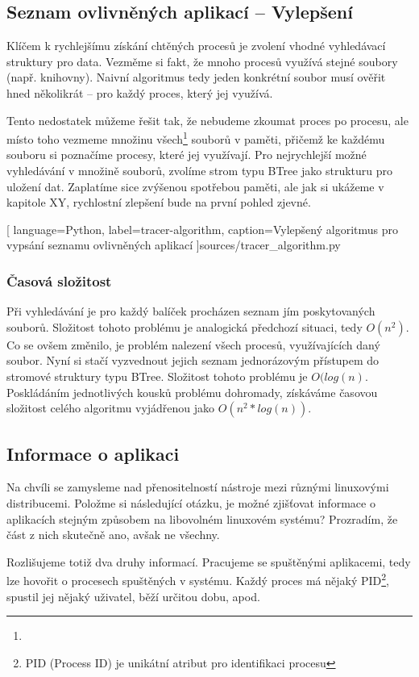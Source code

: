 \documentclass[
  field=inf,
  biblatex,
  glossaries,
  index
]{kidiplom}
\begin{document}
	\subsection{Seznam ovlivněných aplikací -- Vylepšení}
	Klíčem k rychlejšímu získání chtěných procesů je zvolení vhodné vyhledávací struktury pro data. Vezměme si fakt, že mnoho procesů využívá stejné soubory (např. knihovny). Naivní algoritmus tedy jeden konkrétní soubor musí ověřit hned několikrát -- pro každý proces, který jej využívá.

	Tento nedostatek můžeme řešit tak, že nebudeme zkoumat proces po procesu, ale místo toho vezmeme množinu všech\footnote{} souborů v paměti, přičemž ke každému souboru si poznačíme procesy, které jej využívají. Pro nejrychlejší možné vyhledávání v množině souborů, zvolíme strom typu BTree jako strukturu pro uložení dat. Zaplatíme sice zvýšenou spotřebou paměti, ale jak si ukážeme v kapitole XY, rychlostní zlepšení bude na první pohled zjevné.

	
	[
		language={Python},
		label=tracer-algorithm,
		caption={Vylepšený algoritmus pro vypsání seznamu ovlivněných aplikací}
	]{sources/tracer_algorithm.py}

		\subsubsection*{Časová složitost}
		Při vyhledávání je pro každý balíček procházen seznam jím poskytovaných souborů. Složitost tohoto problému je analogická předchozí situaci, tedy $O(n^2)$. Co se ovšem změnilo, je problém nalezení všech procesů, využívajících daný soubor. Nyní si stačí vyzvednout jejich seznam jednorázovým přístupem do stromové struktury typu BTree. Složitost tohoto problému je $O(log(n)$. Poskládáním jednotlivých kousků problému dohromady, získáváme časovou složitost celého algoritmu vyjádřenou jako $O(n^2 * log(n))$.

	\subsection{Informace o aplikaci}
	Na chvíli se zamysleme nad přenositelností nástroje mezi různými linuxovými distribucemi. Položme si následující otázku, je možné zjišťovat informace o aplikacích stejným způsobem na libovolném linuxovém systému? Prozradím, že část z nich skutečně ano, avšak ne všechny.

	Rozlišujeme totiž dva druhy informací. Pracujeme se spuštěnými aplikacemi, tedy lze hovořit o procesech spuštěných v systému. Každý proces má nějaký PID\footnote{PID (Process ID) je unikátní atribut pro identifikaci procesu}, spustil jej nějaký uživatel, běží určitou dobu, apod.
\end{document}
